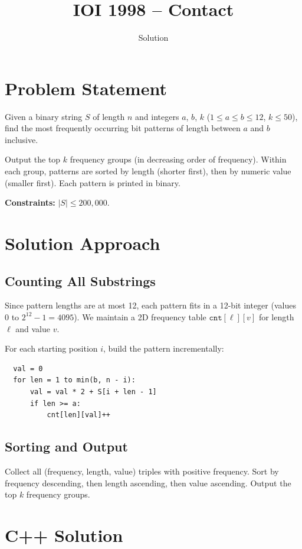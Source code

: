 \documentclass[11pt,a4paper]{article}
\title{IOI 1998 -- Contact}
\author{Solution}
\date{}
\begin{document}
\maketitle

\section{Problem Statement}

Given a binary string $S$ of length $n$ and integers $a$, $b$, $k$
($1 \le a \le b \le 12$, $k \le 50$), find the most frequently occurring bit
patterns of length between $a$ and $b$ inclusive.

Output the top $k$ frequency groups (in decreasing order of frequency).
Within each group, patterns are sorted by length (shorter first), then by
numeric value (smaller first). Each pattern is printed in binary.

\medskip
\noindent\textbf{Constraints:} $|S| \le 200{,}000$.

\section{Solution Approach}

\subsection{Counting All Substrings}

Since pattern lengths are at most 12, each pattern fits in a 12-bit integer
(values 0 to $2^{12} - 1 = 4095$). We maintain a 2D frequency table
$\mathtt{cnt}[\ell][v]$ for length $\ell$ and value $v$.

For each starting position $i$, build the pattern incrementally:
\begin{verbatim}
  val = 0
  for len = 1 to min(b, n - i):
      val = val * 2 + S[i + len - 1]
      if len >= a:
          cnt[len][val]++
\end{verbatim}

\subsection{Sorting and Output}

Collect all (frequency, length, value) triples with positive frequency.
Sort by frequency descending, then length ascending, then value ascending.
Output the top $k$ frequency groups.

\section{C++ Solution}
\end{document}
